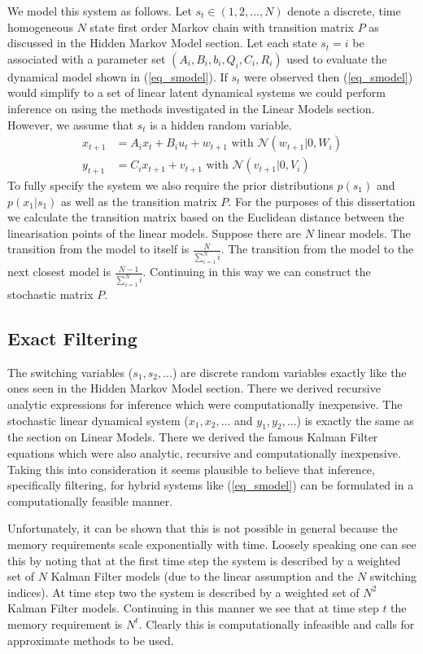 \documentclass[../masters.tex]{subfiles}
\begin{document}
We model this system as follows. Let $s_t \in (1,2,..., N)$ denote a discrete, time homogeneous $N$ state first order Markov chain with transition matrix $P$ as discussed in the Hidden Markov Model section. Let each state $s_t=i$ be associated with a parameter set $\left(A_i, B_i, b_i, Q_i, C_i, R_i \right)$ used to evaluate the dynamical model shown in (\ref{eq_smodel}). If $s_t$ were observed then (\ref{eq_smodel}) would simplify to a set of linear latent dynamical systems we could perform inference on using the methods investigated in the Linear Models section. However, we assume that $s_t$ is a hidden random variable.
\begin{equation}
\begin{aligned}
x_{t+1} &= A_ix_t + B_iu_t + w_{t+1} \text{ with } \mathcal{N}(w_{t+1}|0,W_i) \\
y_{t+1} &= C_ix_{t+1} + v_{t+1}  \text{ with } \mathcal{N}(v_{t+1}|0,V_i)
\end{aligned}
\label{eq_smodel}
\end{equation}
To fully specify the system we also require the prior distributions $p(s_1)$ and $p(x_1|s_1)$ as well as the transition matrix $P$. For the purposes of this dissertation we calculate the transition matrix based on the Euclidean distance between the linearisation points of the linear models. Suppose there are $N$ linear models. The transition from the model to itself is $\frac{N}{\sum_{i=1}^N i}$. The transition from the model to the next closest model is $\frac{N-1}{\sum_{i=1}^N i}$. Continuing in this way we can construct the stochastic matrix $P$.

\subsection{Exact Filtering}
The switching variables ($s_1, s_2,...$) are discrete random variables exactly like the ones seen in the Hidden Markov Model section. There we derived recursive analytic expressions for inference which were computationally inexpensive. The stochastic linear dynamical system ($x_1,x_2,...$ and $y_1, y_2,...$) is exactly the same as the section on Linear Models. There we derived the famous Kalman Filter equations which were also analytic, recursive and computationally inexpensive. Taking this into consideration it seems plausible to believe that inference, specifically filtering, for hybrid systems like (\ref{eq_smodel}) can be formulated in a computationally feasible manner. 

Unfortunately, it can be shown that this is not possible in general \cite{lerner}\cite{murphy3} because the memory requirements scale exponentially with time. Loosely speaking one can see this by noting that at the first time step the system is described by a weighted set of $N$ Kalman Filter models (due to the linear assumption and the $N$ switching indices). At time step two the system is described by a weighted set of $N^2$ Kalman Filter models. Continuing in this manner we see that at time step $t$ the memory requirement is $N^t$. Clearly this is computationally infeasible and calls for approximate methods to be used. 
\end{document}
